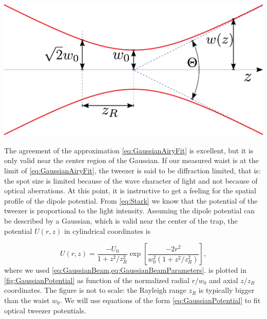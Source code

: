\begin{mdframed}
    \vspace*{3mm}
    \centering
        \includegraphics[width=0.52\linewidth]{figures/GaussianBeam.pdf}
        \captionsetup{margin=0mm}%
        \label{fig:GaussianBeam}
\end{mdframed}
The agreement of the approximation \cref{eq:GaussianAiryFit} is excellent, but it is only valid near the center region of the Gaussian. 
If our measured waist is at the limit of \cref{eq:GaussianAiryFit}, the tweezer is said to be diffraction limited, that is: the spot size is limited because of the wave character of light and not because of optical aberrations. 
At this point, it is instructive to get a feeling for the spatial profile of the dipole potential.
From \cref{eq:Stark} we know that the potential of the tweezer is proportional to the light intensity. 
Assuming the dipole potential can be described by a Gaussian, which is valid \cite{Zhang2007} near the center of the trap, the potential $U(r,z)$ in cylindrical coordinates is

\begin{equation}\label{eq:GaussianPotential}
    U(r,z)=\frac{-U_{0}}{1+z^{2} / z_{R}^{2}} \exp \left[\frac{-2 r^{2}}{w_{0}^{2}\left(1+z^{2} / z_{R}^{2}\right)}\right],
\end{equation}
where we used \cref{eq:GaussianBeam,eq:GaussianBeamParameters}.
 is plotted in \cref{fig:GaussianPotential} as function of the normalized radial $r/w_0$ and axial $z/z_R$ coordinates. 
The figure is not to scale: the Rayleigh range $z_R$ is typically bigger than the waist $w_0$.
We will use equations of the form \cref{eq:GaussianPotential} to fit optical tweezer potentials.

